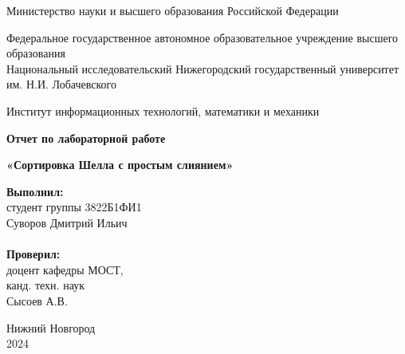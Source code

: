 \documentclass{report}
\begin{document}
\begin{titlepage}

\begin{center}
Министерство науки и высшего образования Российской Федерации
\end{center}

\begin{center}
Федеральное государственное автономное образовательное учреждение высшего образования \\
Национальный исследовательский Нижегородский государственный университет им. Н.И. Лобачевского
\end{center}

\begin{center}
Институт информационных технологий, математики и механики
\end{center}

\vspace{4em}

\begin{center}
\textbf{\Large Отчет по лабораторной работе} \\
\end{center}
\begin{center}
\textbf{\Large «Сортировка Шелла с простым слиянием»} \\
\end{center}

\vspace{4em}

\newbox{\lbox}
\newlength{\maxl}
\setlength{\maxl}{\wd\lbox}
\hfill\parbox{7cm}{
\hspace*{5cm}\hspace*{-5cm}\textbf{Выполнил:} \\ студент группы 3822Б1ФИ1 \\ Суворов Дмитрий Ильич\\
\\
\hspace*{5cm}\hspace*{-5cm}\textbf{Проверил:}\\ доцент кафедры МОСТ, \\ канд. техн. наук \\ Сысоев А.В.\\}
\vspace{\fill}

\begin{center} Нижний Новгород \\ 2024 \end{center}

\end{titlepage}
\end{document}
